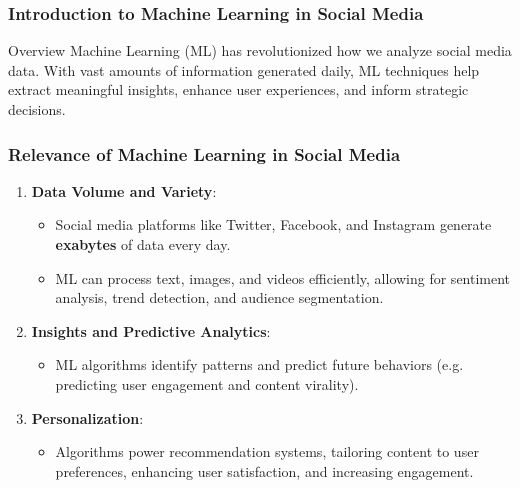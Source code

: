 \documentclass{beamer}
\begin{document}
\begin{frame}[fragile]
    \frametitle{Introduction to Machine Learning in Social Media}
    \begin{block}{Overview}
        Machine Learning (ML) has revolutionized how we analyze social media data. With vast amounts of information generated daily, ML techniques help extract meaningful insights, enhance user experiences, and inform strategic decisions.
    \end{block}
\end{frame}

\begin{frame}[fragile]
    \frametitle{Relevance of Machine Learning in Social Media}
    \begin{enumerate}
        \item \textbf{Data Volume and Variety}:
            \begin{itemize}
                \item Social media platforms like Twitter, Facebook, and Instagram generate \textbf{exabytes} of data every day.
                \item ML can process text, images, and videos efficiently, allowing for sentiment analysis, trend detection, and audience segmentation.
            \end{itemize}
            
        \item \textbf{Insights and Predictive Analytics}:
            \begin{itemize}
                \item ML algorithms identify patterns and predict future behaviors (e.g. predicting user engagement and content virality).
            \end{itemize}
            
        \item \textbf{Personalization}:
            \begin{itemize}
                \item Algorithms power recommendation systems, tailoring content to user preferences, enhancing user satisfaction, and increasing engagement.
            \end{itemize}
    \end{enumerate}
\end{frame}
\end{document}
